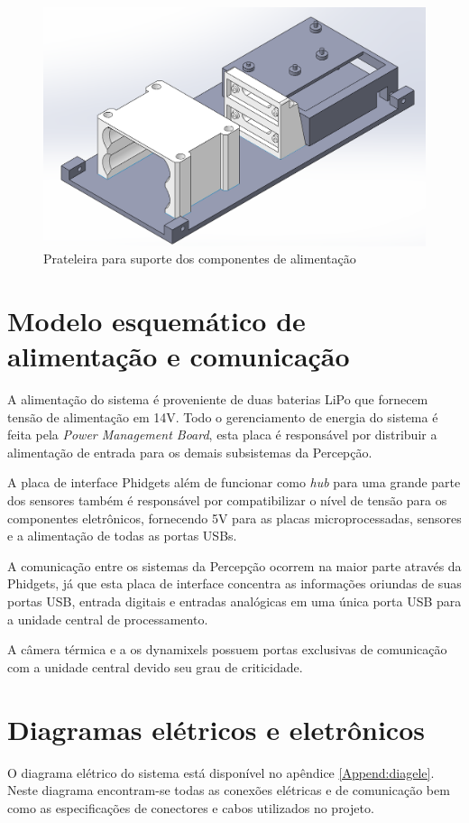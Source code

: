 \begin{itemize}
	\begin{figure}[h]
		\centering
		\includegraphics[width=14cm]{Figures/pecadebaixo.png}
		\caption{Prateleira para suporte dos componentes de alimentação} \label{pecaaliment}
	\end{figure}
	
	\section{Modelo esquemático de alimentação e comunicação}
	\label{sec:modesq}
	A alimentação do sistema é proveniente de duas baterias LiPo que fornecem tensão de alimentação em 14V. Todo o gerenciamento de energia do sistema é feita pela \textit{Power Management Board}, esta placa é responsável por distribuir a alimentação de entrada para os demais subsistemas da Percepção. 
	
	A placa de interface Phidgets além de funcionar como \textit{hub} para uma grande parte dos sensores também é responsável por compatibilizar o nível de tensão para os componentes eletrônicos, fornecendo 5V para as placas microprocessadas, sensores e a alimentação de todas as portas USBs. 
	
	A comunicação entre os sistemas da Percepção ocorrem na maior parte  através da Phidgets, já que esta placa de interface concentra as informações oriundas de suas portas USB, entrada digitais e entradas analógicas em uma única porta USB para a unidade central de processamento.
	
	A câmera térmica e a os dynamixels possuem portas exclusivas de comunicação com a unidade central devido seu grau de criticidade.
	
	\section{Diagramas elétricos e eletrônicos}
	\label{sec:diage}
	O diagrama elétrico do sistema está disponível no apêndice \ref{Append:diagele}. Neste diagrama encontram-se todas as conexões elétricas e de comunicação bem como as especificações de conectores e cabos utilizados no projeto.
	

\end{itemize}

